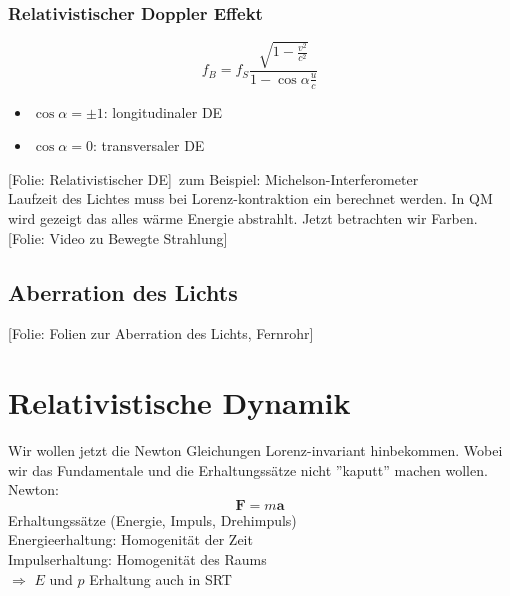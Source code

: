 \documentclass[titlepage,11pt,a4paper,ngerman]{report}
\newcommand{\folie}[1]{\color{gray}[Folie: #1]\color{black}}
\renewcommand{\vec}[1]{\boldsymbol{#1}}
\newcommand{\lcom}[1]{\color{MidnightBlue}#1\color{black}}
\begin{document}
\subsubsection{Relativistischer Doppler Effekt}
\begin{equation*}
f_B = f_S \frac{\sqrt{1 - \frac{v^2}{c^2}}}{1 - \cos \alpha \frac{u}{c}}
\end{equation*}
\begin{itemize}
	\item $ \cos \alpha = \pm 1 $: longitudinaler DE
	\item $ \cos \alpha = 0 $: transversaler DE
\end{itemize}
\folie{Relativistischer DE}\ zum Beispiel: Michelson-Interferometer\\
\lcom{Laufzeit des Lichtes muss bei Lorenz-kontraktion ein berechnet werden. In QM wird gezeigt das alles wärme Energie abstrahlt. Jetzt betrachten wir Farben.}\\
\folie{Video zu Bewegte Strahlung}

\subsection{Aberration des Lichts}

\folie{Folien zur Aberration des Lichts, Fernrohr}

\section{Relativistische Dynamik}
\lcom{Wir wollen jetzt die Newton Gleichungen Lorenz-invariant hinbekommen. Wobei wir das Fundamentale und die Erhaltungssätze nicht ''kaputt'' machen wollen.}\\
Newton: \begin{equation*}
\vec{F} = m \vec{a}
\end{equation*}
Erhaltungssätze (Energie, Impuls, Drehimpuls)\\[5pt]
Energieerhaltung: Homogenität der Zeit\\
Impulserhaltung: Homogenität des Raums\\[5pt]
$ \Rightarrow $ $ E $ und $ p $ Erhaltung auch in SRT
\end{document}
